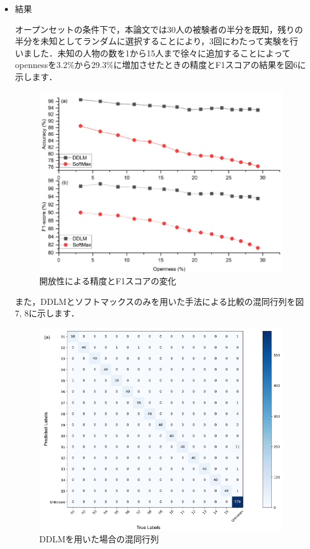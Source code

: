 \documentclass[dvipdfmx]{jsarticle}
\begin{document}
\begin{itemize}
    \item 結果

オープンセットの条件下で，本論文では30人の被験者の半分を既知，残りの半分を未知としてランダムに選択することにより，3回にわたって実験を行いました．未知の人物の数を1から15人まで徐々に追加することによってopennessを3.2\%から29.3\%に増加させたときの精度とF1スコアの結果を図6に示します．

\begin{figure}[H]
\begin{center}
\includegraphics[width=\linewidth]{./img/ddlm_openness.png}
\end{center}
\caption{開放性による精度とF1スコアの変化}
\end{figure}

また，DDLMとソフトマックスのみを用いた手法による比較の混同行列を図7, 8に示します．

\begin{figure}[H]
\begin{center}
\includegraphics[width=0.7\linewidth]{./img/ddlm_conf.png}
\end{center}
\caption{DDLMを用いた場合の混同行列}
\end{figure}


\end{itemize}
\end{document}
